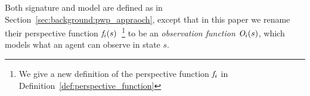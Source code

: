 Both signature and model are defined as in Section~\ref{sec:background:pwp_appraoch}, except that in this paper we rename their perspective function $\mathit{f}_i(s)$~\footnote{We give a new definition of the perspective function $\mathit{f}_i$ in Definition~\ref{def:perspective_function}} to be an \emph{observation function} $\mathit{O}_i(s)$, which models what an agent can observe in state $s$.









